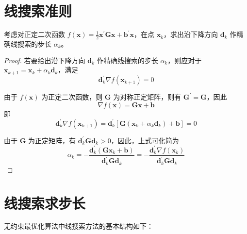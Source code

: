 \documentclass[cn]{elegantbook}
\begin{document}
\section{线搜索准则}

\begin{example}
    考虑对正定二次函数 $f(\mathbf{x})=\frac{1}{2}\mathbf{x}^{\prime}\mathbf{G}\mathbf{x}+\mathbf{b}^{\prime} \mathbf{x}$，在点 $\mathbf{x}_{k}$，求出沿下降方向 $\mathbf{d}_{k}$ 作精确线搜索的步长 $\alpha_{k}$。
\end{example}

\begin{proof}
    若要给出沿下降方向 $\mathbf{d}_{k}$ 作精确线搜索的步长 $\alpha_{k}$，则应对于 $\mathbf{x}_{k+1}=\mathbf{x}_{k}+\alpha_{k}\mathbf{d}_{k}$，满足
    \begin{equation}
        \mathbf{d}_{k}^{\prime}\nabla f(\mathbf{x}_{k+1})=0
    \end{equation}

    由于 $f(\mathbf{x})$ 为正定二次函数，则 $\mathbf{G}$ 为对称正定矩阵，则有 $\mathbf{G}^{\prime}=\mathbf{G}$，因此
    \begin{equation}
        \nabla f(\mathbf{x})=\mathbf{G}\mathbf{x}+\mathbf{b}
    \end{equation}
    即
    \begin{equation}
        \mathbf{d}_{k}^{\prime}\nabla f(\mathbf{x}_{k+1})=\mathbf{d}_{k}^{\prime}\left[\mathbf{G}\left(\mathbf{x}_{k}+\alpha_{k}\mathbf{d}_{k}\right)+\mathbf{b}\right]=0
    \end{equation}

    由于 $\mathbf{G}$ 为正定矩阵，有 $\mathbf{d}_{k}^{\prime}\mathbf{G}\mathbf{d}_{k}>0$，因此，上式可化简为
    \begin{equation}
        \alpha_{k}=-\frac{\mathbf{d}_{k}^{\prime}\left(\mathbf{G}\mathbf{x}_{k}+\mathbf{b}\right)}{\mathbf{d}_{k}^{\prime}\mathbf{G}\mathbf{d}_{k}}=-\frac{\mathbf{d}_{k}^{\prime}\nabla f(\mathbf{x}_{k})}{\mathbf{d}_{k}^{\prime}\mathbf{G}\mathbf{d}_{k}}
    \end{equation}
\end{proof}

\section{线搜索求步长}

无约束最优化算法中线搜索方法的基本结构如下：
\end{document}
